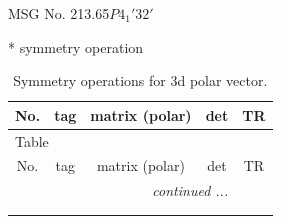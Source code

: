 \documentclass[fleqn,8pt]{jsarticle}
\begin{document}
\setcounter{MaxMatrixCols}{32}

\renewcommand{\tablename}{Table~}
\renewcommand{\figurename}{Figure~}
\begin{center}
\LARGE
MSG No. 213.65\quad$P4_{1}'32'$
\end{center}
* symmetry operation
\renewcommand{\arraystretch}{1.3}
\begin{longtable}{ccccc}
\caption{Symmetry operations for 3d polar vector.}
 \\
 \hline \hline
No. & tag & matrix (polar) & det & TR \\ \hline \endfirsthead

\multicolumn{4}{l}{\tablename\ \thetable{}} \\
 \hline \hline
No. & tag & matrix (polar) & det & TR \\ \hline \endhead

 \hline \hline
\multicolumn{4}{r}{\footnotesize\it continued ...} \\ \endfoot

 \hline \hline
\multicolumn{4}{r}{} \\ \endlastfoot


\end{longtable}
\end{document}
